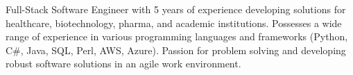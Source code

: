
\begin{cvparagraph}
    Full-Stack Software Engineer with 5 years of experience developing solutions for healthcare, biotechnology, pharma, and academic institutions. Possesses a wide range of experience in various programming languages and frameworks (Python, C#, Java, SQL, Perl, AWS, Azure). Passion for problem solving and developing robust software solutions in an agile work environment.
    
\end{cvparagraph}
